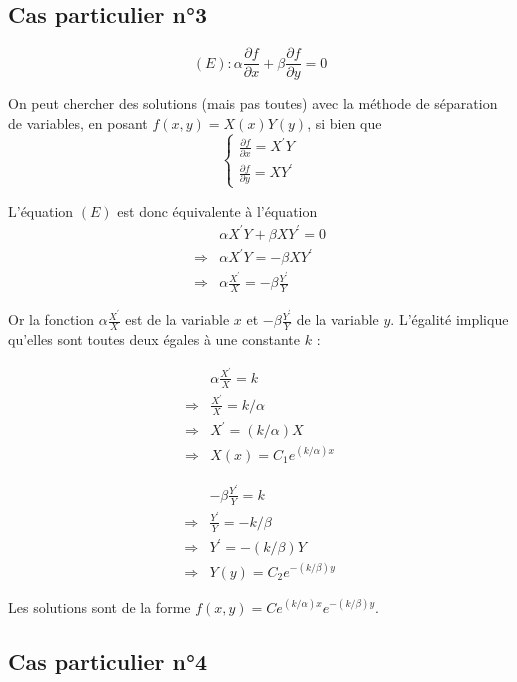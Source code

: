 \documentclass[12pt]{article}
\begin{document}
\subsection{Cas particulier n°3}

$$
(E): \alpha \frac{\partial f}{\partial x} + \beta \frac{\partial f}{\partial y} = 0
$$

On peut chercher des solutions (mais pas toutes) avec la méthode de séparation de variables, en posant $f(x, y)=X(x) Y(y)$, si bien que
$$
\left\{\begin{array}{l}
\frac{\partial f}{\partial x} = X^{\prime} Y \\
\frac{\partial f}{\partial y} = X Y^{\prime}
\end{array}\right.
$$

L'équation $(E)$ est donc équivalente à l'équation
$$
\begin{array}{ll} 
& \alpha X^{\prime} Y + \beta X Y^{\prime} = 0 \\
\Longrightarrow & \alpha X^{\prime} Y = -\beta X Y^{\prime} \\
\Longrightarrow & \alpha \frac{X^{\prime}}{X} = -\beta \frac{Y^{\prime}}{Y}
\end{array}
$$

Or la fonction $\alpha \frac{X^{\prime}}{X}$ est de la variable $x$ et $-\beta \frac{Y^{\prime}}{Y}$ de la variable $y$. L'égalité implique qu'elles sont toutes deux égales à une constante $k$ :

$$
\begin{array}{ll} 
& \alpha \frac{X^{\prime}}{X} = k \\
\Longrightarrow & \frac{X^{\prime}}{X} = k / \alpha \\
\Longrightarrow & X^{\prime} = (k / \alpha) X \\
\Longrightarrow & X(x) = C_{1} e^{(k / \alpha) x}
\end{array}
$$

$$
\begin{array}{ll} 
& -\beta \frac{Y^{\prime}}{Y} = k \\
\Longrightarrow & \frac{Y^{\prime}}{Y} = -k / \beta \\
\Longrightarrow & Y^{\prime} = -(k / \beta) Y \\
\Longrightarrow & Y(y) = C_{2} e^{-(k / \beta) y}
\end{array}
$$

Les solutions sont de la forme $f(x, y) = C e^{(k / \alpha) x} e^{-(k / \beta) y}$.

\subsection{Cas particulier n°4}
\end{document}
